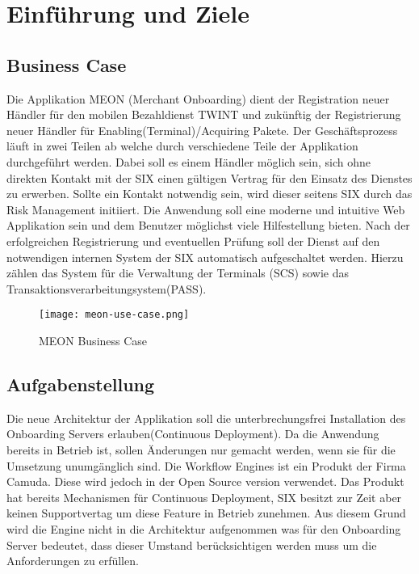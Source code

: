 \graphicspath{{./images/}}


\chapter{Einführung und Ziele}

\section{Business Case}
\label{businesscase}

Die Applikation MEON (Merchant Onboarding) dient der Registration neuer Händler für den mobilen Bezahldienst TWINT und zukünftig der Registrierung neuer Händler für Enabling(Terminal)/Acquiring Pakete. Der Geschäftsprozess läuft in zwei Teilen ab welche durch verschiedene Teile der Applikation durchgeführt werden.  Dabei soll es einem Händler möglich sein, sich ohne direkten Kontakt mit der SIX einen gültigen Vertrag für den Einsatz des Dienstes zu erwerben. Sollte ein Kontakt notwendig sein, wird dieser seitens SIX durch das Risk Management initiiert.\newline
Die Anwendung soll eine moderne und intuitive Web Applikation sein und dem Benutzer möglichst viele Hilfestellung bieten. Nach der erfolgreichen Registrierung und  eventuellen Prüfung soll der Dienst auf den notwendigen internen System der SIX automatisch aufgeschaltet werden. Hierzu zählen das System für die Verwaltung der Terminals (SCS) sowie das Transaktionsverarbeitungsystem(PASS).

\begin{figure}[H]
	\centering
	\texttt{[image: meon-use-case.png]}
	\caption{MEON Business Case}
\end{figure}
\newpage
\section{Aufgabenstellung}

Die neue Architektur der Applikation soll die unterbrechungsfrei Installation des Onboarding Servers erlauben(Continuous Deployment). Da die Anwendung bereits in Betrieb ist, sollen Änderungen nur gemacht werden, wenn sie für die Umsetzung unumgänglich sind. \newline Die Workflow Engines ist ein Produkt der Firma Camuda. Diese wird jedoch in der Open Source version verwendet. Das Produkt hat bereits Mechanismen für Continuous Deployment, SIX besitzt zur Zeit aber keinen Supportvertag um diese Feature in Betrieb zunehmen. Aus diesem Grund wird die Engine nicht in die Architektur aufgenommen was für den  Onboarding Server bedeutet, dass dieser Umstand berücksichtigen werden muss um die Anforderungen zu erfüllen.

